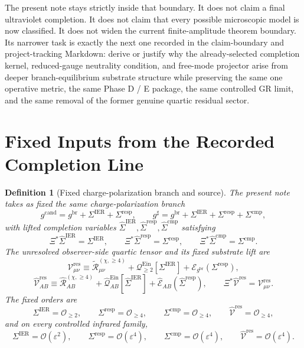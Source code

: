\documentclass[11pt]{article}
\newcommand{\ObserverMap}{\Xi}
\newcommand{\ObserverMetric}{g^{\mathrm{br}}}
\newcommand{\CandidateMetric}{g^{\mathrm{cand}}}
\newcommand{\CompletedMetric}{g^{\sharp}}
\newcommand{\BaseShift}{\Sigma^{\mathrm{IER}}}
\newcommand{\ResponseShift}{\Sigma^{\mathrm{resp}}}
\newcommand{\CompShift}{\Sigma^{\mathrm{cmp}}}
\newcommand{\BaseLift}{\widehat\Sigma^{\mathrm{IER}}}
\newcommand{\ResponseLift}{\widehat\Sigma^{\mathrm{resp}}}
\newcommand{\CompLift}{\widehat\Sigma^{\mathrm{cmp}}}
\newcommand{\ReLongFour}{\widetilde{\mathcal R}_{\mu\nu}^{(\chi,\ge 4)}}
\newcommand{\ResidualCore}{\mathcal V_{\mu\nu}^{\mathrm{res}}}
\newcommand{\ResidualLift}{\widehat{\mathcal V}^{\mathrm{res}}}
\newcommand{\EinLin}{\mathcal E_{\ObserverMetric}}
\newcommand{\EinQuad}{\mathcal Q_{\ge 2}^{\mathrm{Ein}}}
\newcommand{\epsIR}{\varepsilon}
\newtheorem{definition}{Definition}
\begin{document}
The present note stays strictly inside that boundary. It does not claim a final ultraviolet completion. It does not claim that every possible microscopic model is now classified. It does not widen the current finite-amplitude theorem boundary. Its narrower task is exactly the next one recorded in the claim-boundary and project-tracking Markdown: derive or justify why the already-selected completion kernel, reduced-gauge neutrality condition, and free-mode projector arise from deeper branch-equilibrium substrate structure while preserving the same one operative metric, the same Phase D / E package, the same controlled GR limit, and the same removal of the former genuine quartic residual sector.

\section{Fixed Inputs from the Recorded Completion Line}

\begin{definition}[Fixed charge-polarization branch and source]
\label{def:fixed}
The present note takes as fixed the same charge-polarization branch
\begin{equation}
\CandidateMetric
=
\ObserverMetric+\BaseShift+\ResponseShift,
\qquad
\CompletedMetric
=
\ObserverMetric+\BaseShift+\ResponseShift+\CompShift,
\label{eq:metrics}
\end{equation}
with lifted completion variables \(\BaseLift,\ResponseLift,\CompLift\) satisfying
\begin{equation}
\ObserverMap^*\BaseLift=\BaseShift,
\qquad
\ObserverMap^*\ResponseLift=\ResponseShift,
\qquad
\ObserverMap^*\CompLift=\CompShift.
\label{eq:lifts}
\end{equation}
The unresolved observer-side quartic tensor and its fixed substrate lift are
\begin{equation}
\ResidualCore
\equiv
\ReLongFour
+\EinQuad[\BaseShift]
+\EinLin(\ResponseShift),
\label{eq:vres}
\end{equation}
\begin{equation}
\ResidualLift_{AB}
\equiv
\widehat{\mathcal R}_{AB}^{(\chi,\ge 4)}
+\widehat{\mathcal Q}_{AB}^{\mathrm{Ein}}[\BaseLift]
+\widehat{\mathcal E}_{AB}(\ResponseLift),
\qquad
\ObserverMap^*\ResidualLift=\ResidualCore.
\label{eq:liftedsource}
\end{equation}
The fixed orders are
\begin{equation}
\BaseShift=\mathcal O_{\ge 2},
\qquad
\ResponseShift=\mathcal O_{\ge 4},
\qquad
\CompShift=\mathcal O_{\ge 4},
\qquad
\ResidualLift=\mathcal O_{\ge 4},
\label{eq:orders}
\end{equation}
and on every controlled infrared family,
\begin{equation}
\BaseShift=\mathcal O(\epsIR^2),
\qquad
\ResponseShift=\mathcal O(\epsIR^4),
\qquad
\CompShift=\mathcal O(\epsIR^4),
\qquad
\ResidualLift=\mathcal O(\epsIR^4).
\label{eq:irorders}
\end{equation}
\end{definition}
\end{document}
